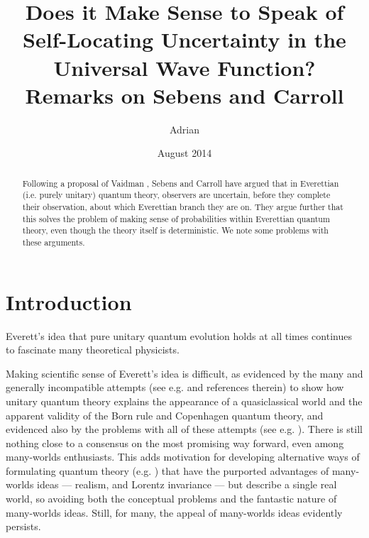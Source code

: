\documentclass[aps,prl]{revtex4}
\begin{document}
\title{Does it Make Sense to Speak of
Self-Locating Uncertainty in the Universal Wave
Function? Remarks on Sebens and Carroll}

\author{Adrian }

\date{August 2014} 

\begin{abstract}
Following a proposal of Vaidman \cite{vaidman1998,vaidman2008,vaidman2011},
Sebens and Carroll \cite{cs1,cs2} have argued that 
in Everettian (i.e. purely unitary) quantum theory,
observers are uncertain, before they complete
their observation, about which Everettian
branch they are on.  They argue further that this
solves the problem of making sense of probabilities within 
Everettian quantum theory, even though
the theory itself is deterministic.
We note some problems with these arguments.   
\end{abstract}
\maketitle
  
\section{Introduction}

Everett's idea \cite{everett1957relative} that pure unitary quantum
evolution holds at all times continues to 
fascinate many theoretical physicists.

Making scientific sense of Everett's idea is difficult,
as evidenced by the many and generally incompatible attempts 
(see e.g. \cite{dewittmany,mwbook,geroch1984everett,deutsch1996comment,zurek2009quantum,gell1990quantum,hartle1991quantum,vaidman2011}
and references therein)
to
show how unitary quantum theory explains the appearance
of a quasiclassical world and the 
apparent validity of the Born rule and Copenhagen
quantum theory, and evidenced also by the problems with
all of these attempts (see e.g.
\cite{bell2004speakable,kent1990against,albert1988interpreting,kentoneworld,albert,price}). 
There is still nothing close to a consensus
on the most promising way forward, even among
many-worlds enthusiasts.  This adds motivation
for developing alternative ways of  
formulating quantum theory (e.g. \cite{kentsolution}) 
that have the purported advantages
of many-worlds ideas --- realism, and Lorentz invariance ---
but describe a single real world, so avoiding both
the conceptual problems and the fantastic nature of
many-worlds ideas.   Still, for many, the appeal of many-worlds
ideas evidently persists.   
\end{document}

